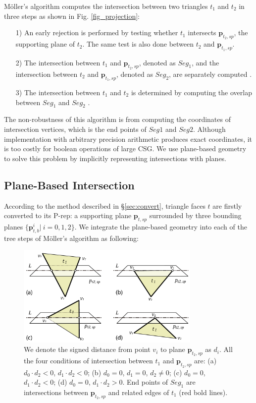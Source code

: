 \documentclass[10pt,journal,compsoc]{IEEEtran}
\begin{document}
M\"{o}ller's algorithm computes the intersection between two triangles $t_1$ and $t_2$ in three steps as shown in Fig. \ref{fig_projection}:
\begin{itemize}[leftmargin=0.45cm]
\item[1)] An early rejection is performed by testing whether $t_1$ intersects $\bm{p}_{t_2, sp}$, the supporting plane of $t_2$. The same test is also done between $t_2$ and $\bm{p}_{t_1, sp}$.
\item[2)]The intersection between $t_1$ and $\bm{p}_{t_2, sp}$, denoted as $Seg_1$, and the intersection between $t_2$ and $\bm{p}_{t_1, sp}$, denoted as $Seg_2$, are separately computed .
 \item[3)]The intersection between $t_1$ and $t_2$ is determined by computing the overlap between $Seg_1$ and $Seg_2$ .
\end{itemize}

The non-robustness of this algorithm is from computing the coordinates of intersection vertices, which is the end points of $Seg1$ and $Seg2$. Although implementation with arbitrary precision arithmetic produces exact coordinates, it is too costly for boolean operations of large CSG. We use plane-based geometry to solve this problem by implicitly representing intersections with planes.


\subsection{Plane-Based Intersection}

\label{sec:embed}
According to the method described in \S\ref{sec:convert}, triangle faces $t$ are firstly converted to its P-rep: a supporting plane $\bm{p}_{t, sp}$ surrounded by three bounding planes $\{\bm{p}_{t, b}^i|\ i = 0,1,2\}$. We integrate the plane-based geometry into each of the tree steps of M\"{o}ller's algorithm as following:

\begin{figure}[t]
\centering
\includegraphics[width=3.5in]{sign}
\caption{We denote the signed distance from point $v_i$ to plane $\bm{p}_{t_2, sp}$ as $d_i$. All the four conditions of intersection between $t_1$ and $\bm{p}_{t_2, sp}$ are:  (a) $d_0\cdot d_2<0$, $d_1\cdot d_2<0$; (b) $d_0=0$, $d_1=0$, $d_2\neq 0$; (c) $d_0=0$, $d_1\cdot d_2<0$; (d) $d_0=0$, $d_1\cdot d_2>0$. End points of $Seg_1$ are intersections between $\bm{p}_{t_2, sp}$ and related edges of $t_1$ (red bold lines).}
\label{fig:isect}
\end{figure}
\end{document}
